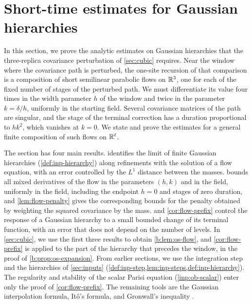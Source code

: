 \chapter{Short-time estimates for Gaussian hierarchies}\label{sec:flow}

In this section, we prove the analytic estimates on Gaussian hierarchies that
the three-replica covariance perturbation of \cref{sec:cubic} requires. Near the
window where the covariance path is perturbed, the one-site recursion of that
comparison is a composition of short semilinear parabolic flows on $\mathbb R^3$, one
for each of the fixed number of stages of the perturbed path. We must differentiate its value
four times in the width parameter $h$ of the window and twice in the
parameter $k=\delta/h$, uniformly in the starting field. Several covariance
matrices of the path are singular, and the stage of the terminal correction has
a duration proportional to $hk^2$, which vanishes at $k=0$. We state and prove
the estimates for a general finite composition of such flows on $\mathbb R^\ell$.

The section has four main results.  identifies the
limit of finite Gaussian hierarchies (\cref{def:inp-hierarchy}) along
refinements with the solution of a flow equation, with an error controlled by
the $L^1$ distance between the masses.  bounds all mixed
derivatives of the flow in the parameters $(h,k)$ and in the field, uniformly in
the field, including the endpoint $h=0$ and stages of zero duration, and
\cref{lem:flow-penalty} gives the corresponding bounds for the penalty obtained
by weighting the squared covariance by the mass.  and \cref{cor:flow-prefix}
control the response of a Gaussian hierarchy to a small bounded change of its
terminal function, with an error that does not depend on the number of levels.
In \cref{sec:cubic}, we use the first three results to obtain \cref{b:lem:os-flow}, and
\cref{cor:flow-prefix} is applied to the part of the hierarchy that precedes the
window, in the proof of \cref{b:prop:os-expansion}. From earlier sections, we use
the integration step and the hierarchies of \cref{sec:inputs}
(\cref{def:inp-step,lem:inp-steps,def:inp-hierarchy}). The regularity and
stability of the scalar Parisi equation (\cref{inp:ob-scalar}) enter only the
proof of \cref{cor:flow-prefix}. The remaining tools are the Gaussian
interpolation formula, It\^o's formula, and Gronwall's inequality
\cite[Section~A.13]{talagrand-2011}.

